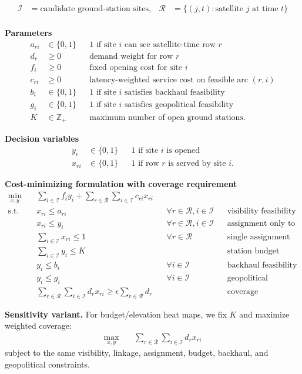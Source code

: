 \begin{align}
\mathcal{I} &= \text{candidate ground-station sites}, &
\mathcal{R} &= \{(j,t): \text{satellite } j \text{ at time } t\} \\
\end{align}

\noindent\textbf{Parameters}
\begin{align}
a_{ri} &\in \{0,1\} && \text{1 if site } i \text{ can see satellite-time row } r \\
d_r &\ge 0 && \text{demand weight for row } r \\
f_i &\ge 0 && \text{fixed opening cost for site } i \\
c_{ri} &\ge 0 && \text{latency-weighted service cost on feasible arc } (r,i) \\
b_i &\in \{0,1\} && \text{1 if site } i \text{ satisfies backhaul feasibility} \\
g_i &\in \{0,1\} && \text{1 if site } i \text{ satisfies geopolitical feasibility} \\
K &\in \mathbb{Z}_+ && \text{maximum number of open ground stations.}
\end{align}

\noindent\textbf{Decision variables}
\begin{align}
y_i &\in \{0,1\} && \text{1 if site } i \text{ is opened} \\
x_{ri} &\in \{0,1\} && \text{1 if row } r \text{ is served by site } i.
\end{align}

\noindent\textbf{Cost-minimizing formulation with coverage requirement } \epsilon
\begin{align}
\min_{x,y}\quad & \sum_{i \in \mathcal{I}} f_i y_i + \sum_{r \in \mathcal{R}}\sum_{i \in \mathcal{I}} c_{ri}x_{ri} \\
\text{s.t.}\quad
& x_{ri} \le a_{ri} && \forall r \in \mathcal{R}, i \in \mathcal{I} && \text{visibility feasibility} \\
& x_{ri} \le y_i && \forall r \in \mathcal{R}, i \in \mathcal{I} && \text{assignment only to open sites} \\
& \sum_{i \in \mathcal{I}} x_{ri} \le 1 && \forall r \in \mathcal{R} && \text{single assignment} \\
& \sum_{i \in \mathcal{I}} y_i \le K && && \text{station budget} \\
& y_i \le b_i && \forall i \in \mathcal{I} && \text{backhaul feasibility} \\
& y_i \le g_i && \forall i \in \mathcal{I} && \text{geopolitical feasibility} \\
& \sum_{r \in \mathcal{R}}\sum_{i \in \mathcal{I}} d_r x_{ri} \ge \epsilon \sum_{r \in \mathcal{R}} d_r && && \text{coverage requirement.}
\end{align}

\noindent\textbf{Sensitivity variant.} For budget/elevation heat maps, we fix $K$ and maximize weighted coverage:
\begin{align}
\max_{x,y}\quad & \sum_{r \in \mathcal{R}}\sum_{i \in \mathcal{I}} d_r x_{ri}
\end{align}
\noindent subject to the same visibility, linkage, assignment, budget, backhaul, and geopolitical constraints.